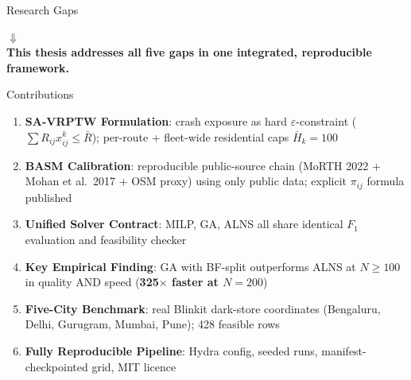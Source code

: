 \documentclass[aspectratio=169,t]{beamer}
\begin{document}
\begin{frame}{Research Gaps}
\begin{center}
\end{center}
\vspace{6pt}
\begin{center}
  \textcolor{iitblue}{\Large$\Downarrow$}\\[3pt]
  \textbf{This thesis addresses all five gaps in one integrated, reproducible framework.}
\end{center}
\end{frame}

\begin{frame}{Contributions}
\begin{enumerate}
  \item \textbf{SA-VRPTW Formulation}: crash exposure as hard
    $\varepsilon$-constraint ($\sum R_{ij}x_{ij}^k \leq \bar{R}$);
    per-route + fleet-wide residential caps $\bar{H}_k = 100$
  \item \textbf{BASM Calibration}: reproducible public-source chain
    (MoRTH 2022 + Mohan et al.\ 2017 + OSM proxy) using only public data;
    explicit $\pi_{ij}$ formula published
  \item \textbf{Unified Solver Contract}: MILP, GA, ALNS all share
    identical $F_1$ evaluation and feasibility checker
  \item \textbf{Key Empirical Finding}: GA with BF-split outperforms
    ALNS at $N\geq100$ in quality AND speed (\textbf{325$\times$ faster at $N=200$})
  \item \textbf{Five-City Benchmark}: real Blinkit dark-store coordinates
    (Bengaluru, Delhi, Gurugram, Mumbai, Pune); 428 feasible rows
  \item \textbf{Fully Reproducible Pipeline}: Hydra config, seeded runs,
    manifest-checkpointed grid, MIT licence
\end{enumerate}
\end{frame}
\end{document}
